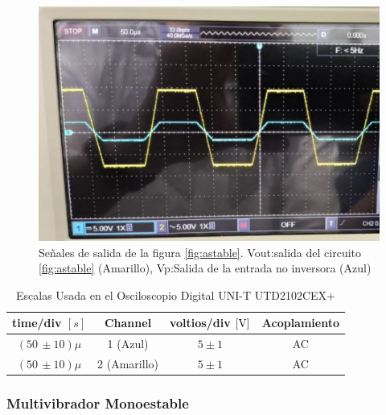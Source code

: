             \begin{figure}[H]
                \centering
                \renewcommand{\figurename}{Imagen}
                \includegraphics[width=15cm]{Imagenes/exp_astable_vp_vout.png}
                \caption{Señales de salida de la figura \ref{fig:astable}. Vout:salida del circuito \ref{fig:astable} (Amarillo), Vp:Salida de la entrada no inversora (Azul)}
                \label{fig:exp_astable_vp_vout}
            \end{figure}

            \begin{table}[H]
                \centering
                \begin{tabular}{|c|c|c|c|}
                    \hline
                    \textbf{time/div} $[s]$ & \textbf{Channel} & \textbf{voltios/div $[\volt]$} & \textbf{Acoplamiento} \\ \hline
                    $(50 \, \pm 10) \mu  $ & 1 (Azul)  &   $5 \pm 1   $ & AC \\ \hline  
                    $(50 \, \pm 10) \mu  $ & 2 (Amarillo)  &   $5 \pm 1   $ & AC \\ \hline  
                \end{tabular}
                \caption{Escalas Usada en el Osciloscopio Digital UNI-T UTD2102CEX+}
                \label{tab:escala_astable_vp_vout}
            \end{table}


        \subsubsection{Multivibrador Monoestable}

